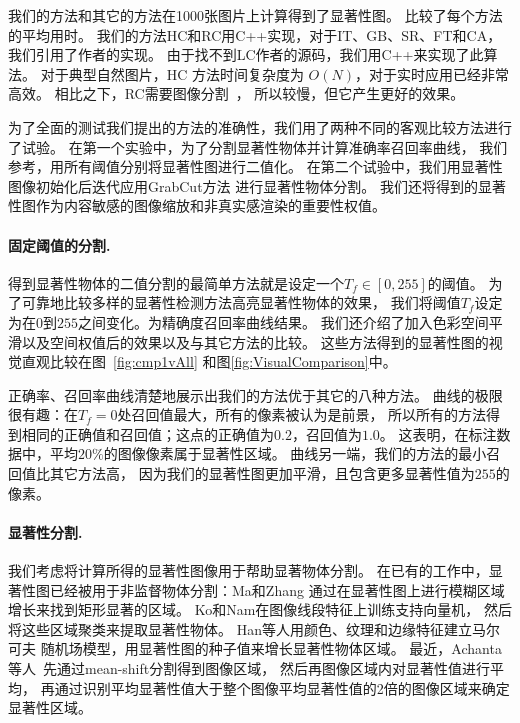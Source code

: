 \documentclass[final]{cvpr}
\newcommand{\mypara}[1]{\paragraph{#1.}}
\begin{document}
我们的方法和其它的方法在1000张图片上计算得到了显著性图。
 比较了每个方法的平均用时。
我们的方法HC和RC用C++实现，对于IT、GB、SR、FT和CA，我们引用了作者的实现。
由于找不到LC作者的源码，我们用C++来实现了此算法。
对于典型自然图片，HC 方法时间复杂度为 $O(N)$，对于实时应用已经非常高效。
相比之下，RC需要图像分割~\cite{04ijcv/felzenszwalb_efficient}，
所以较慢，但它产生更好的效果。



为了全面的测试我们提出的方法的准确性，我们用了两种不同的客观比较方法进行了试验。
在第一个实验中，为了分割显著性物体并计算准确率召回率曲线，
我们参考\cite{09cvpr/Achanta_FTSaliency}，用所有阈值分别将显著性图进行二值化。
在第二个试验中，我们用显著性图像初始化后迭代应用GrabCut方法
\cite{04tog/rother_grabcut}进行显著性物体分割。
我们还将得到的显著性图作为内容敏感的图像缩放和非真实感渲染的重要性权值。



\mypara{固定阈值的分割}
得到显著性物体的二值分割的最简单方法就是设定一个$T_f \in [0, 255]$的阈值。
为了可靠地比较多样的显著性检测方法高亮显著性物体的效果，
我们将阈值$T_f$设定为在$0$到$255$之间变化。为精确度召回率曲线结果。
我们还介绍了加入色彩空间平滑以及空间权值后的效果以及与其它方法的比较。
这些方法得到的显著性图的视觉直观比较在图~\ref{fig:cmp1vAll}
和图\ref{fig:VisualComparison}中。

正确率、召回率曲线清楚地展示出我们的方法优于其它的八种方法。
曲线的极限很有趣：在$T_f=0$处召回值最大，所有的像素被认为是前景，
所以所有的方法得到相同的正确值和召回值；这点的正确值为$0.2$，召回值为$1.0$。
这表明，在标注数据中，平均$20\%$的图像像素属于显著性区域。
曲线另一端，我们的方法的最小召回值比其它方法高，
因为我们的显著性图更加平滑，且包含更多显著性值为$255$的像素。


\mypara{显著性分割}
我们考虑将计算所得的显著性图像用于帮助显著物体分割。
在已有的工作中，显著性图已经被用于非监督物体分割：Ma和Zhang\cite{03ACMMM/Ma_Contrast-based}
通过在显著性图上进行模糊区域增长来找到矩形显著的区域。
Ko和Nam\cite{06josa/KoN_InterestSegmentation}在图像线段特征上训练支持向量机，
然后将这些区域聚类来提取显著性物体。
Han等人\cite{06TCSVT/han_unsupervised}用颜色、纹理和边缘特征建立马尔可夫
随机场模型，用显著性图的种子值来增长显著性物体区域。
最近，Achanta 等人~\cite{09cvpr/Achanta_FTSaliency}先通过mean-shift分割得到图像区域，
然后再图像区域内对显著性值进行平均，
再通过识别平均显著性值大于整个图像平均显著性值的2倍的图像区域来确定显著性区域。
\end{document}
